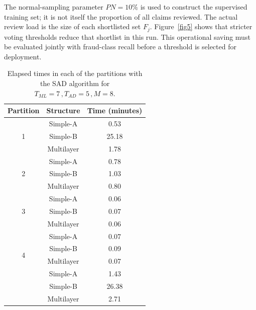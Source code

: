 \documentclass[12pt]{article}
\begin{document}
The normal-sampling parameter $PN=10\%$ is used to construct the supervised
training set; it is not itself the proportion of all claims reviewed. The
actual review load is the size of each shortlisted set $F_j$. Figure~\ref{fig5}
shows that stricter voting thresholds reduce that shortlist in this run. This
operational saving must be evaluated jointly with fraud-class recall before a
threshold is selected for deployment.

        \begin{table}[H]
        \centering
        \caption{Elapsed times in each of the partitions with the SAD algorithm for  $T_{ML} = 7 \,, T_{AD} = 5 \,, M = 8$.}
        \label{table1}
        \scriptsize
        \begin{tabular}{llr}
            \hline
            \multicolumn{1}{c}{Partition} & \multicolumn{1}{c}{Structure} & \multicolumn{1}{c}{Time (minutes)} \\
            \hline
            \multicolumn{1}{c}{\multirow{3}{*}{1}} & \multicolumn{1}{c}{Simple-A} & \multicolumn{1}{c}{0.53} \\
            \multicolumn{1}{c}{} & \multicolumn{1}{c}{Simple-B} & \multicolumn{1}{c}{25.18} \\
            \multicolumn{1}{c}{} & \multicolumn{1}{c}{Multilayer} & \multicolumn{1}{c}{1.78} \\
            \hline
            \multicolumn{1}{c}{\multirow{3}{*}{2}} & \multicolumn{1}{c}{Simple-A} & \multicolumn{1}{c}{0.78} \\
            \multicolumn{1}{c}{} & \multicolumn{1}{c}{Simple-B} & \multicolumn{1}{c}{1.03} \\
            \multicolumn{1}{c}{} & \multicolumn{1}{c}{Multilayer} & \multicolumn{1}{c}{0.80} \\
            \hline
            \multicolumn{1}{c}{\multirow{3}{*}{3}} & \multicolumn{1}{c}{Simple-A} & \multicolumn{1}{c}{0.06} \\
            \multicolumn{1}{c}{} & \multicolumn{1}{c}{Simple-B} & \multicolumn{1}{c}{0.07} \\
            \multicolumn{1}{c}{} & \multicolumn{1}{c}{Multilayer} & \multicolumn{1}{c}{0.06} \\
            \hline
            \multicolumn{1}{c}{\multirow{4}{*}{4}} & \multicolumn{1}{c}{Simple-A} & \multicolumn{1}{c}{0.07} \\
            \multicolumn{1}{c}{} & \multicolumn{1}{c}{Simple-B} & \multicolumn{1}{c}{0.09} \\
            \multicolumn{1}{c}{} & \multicolumn{1}{c}{Multilayer} & \multicolumn{1}{c}{0.07} \\
            \hline
            \multicolumn{1}{c}{\multirow{4}{*}{Total}} & \multicolumn{1}{c}{Simple-A} & \multicolumn{1}{c}{1.43} \\
            \multicolumn{1}{c}{} & \multicolumn{1}{c}{Simple-B} & \multicolumn{1}{c}{26.38} \\
            \multicolumn{1}{c}{} & \multicolumn{1}{c}{Multilayer} & \multicolumn{1}{c}{2.71} \\
            \hline
        \end{tabular}
    \end{table}
\end{document}
